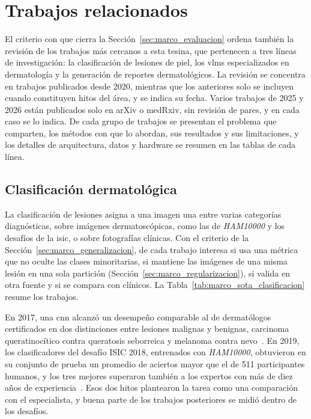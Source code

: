 \section{Trabajos relacionados}
\label{sec:estado_arte}

El criterio con que cierra la Sección~\ref{sec:marco_evaluacion} ordena también la revisión de los trabajos más
cercanos a esta tesina, que pertenecen a tres líneas de investigación: la clasificación de lesiones de piel, los
\glspl{vlm} especializados en dermatología y la generación de reportes dermatológicos. La revisión se concentra en
trabajos publicados desde 2020, mientras que los anteriores solo se incluyen cuando constituyen hitos del área, y
se indica su fecha. Varios trabajos de 2025 y
2026 están publicados solo en arXiv o medRxiv, sin revisión de pares, y en cada caso se lo indica. De cada grupo de
trabajos se presentan el problema que comparten, los métodos con que lo abordan, sus resultados y sus
limitaciones, y los detalles de arquitectura, datos y hardware se resumen en las tablas de cada línea.

\subsection{Clasificación dermatológica}
\label{sec:estado_arte_diagnostico}

La clasificación de lesiones asigna a una imagen una entre varias categorías diagnósticas, sobre imágenes
dermatoscópicas, como las de \emph{HAM10000} y los desafíos de la \gls{isic}, o sobre fotografías clínicas. Con el
criterio de
la Sección~\ref{sec:marco_generalizacion}, de cada trabajo interesa si usa una métrica que no oculte las clases
minoritarias, si mantiene las imágenes de una misma lesión en una sola partición
(Sección~\ref{sec:marco_regularizacion}), si valida en otra fuente y si se compara con clínicos. La
Tabla~\ref{tab:marco_sota_clasificacion} resume los trabajos.

En 2017, una \gls{cnn} alcanzó un desempeño comparable al de dermatólogos certificados en dos distinciones entre
lesiones malignas y benignas, carcinoma queratinocítico contra queratosis seborreica y melanoma contra
nevo~\cite{esteva2017dermatologistlevel}.
En 2019, los clasificadores del desafío ISIC 2018, entrenados con \emph{HAM10000}, obtuvieron en su conjunto de prueba un
promedio de aciertos mayor que el de 511 participantes humanos, y los tres mejores superaron también a los expertos
con más de diez años de experiencia~\cite{tschandl2019comparison}. Esos dos hitos plantearon la tarea como una
comparación con el especialista, y buena parte de los trabajos posteriores se midió dentro de los desafíos.

